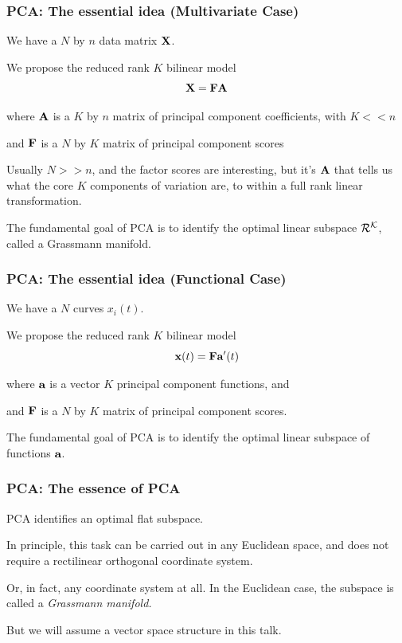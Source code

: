 \documentclass[11pt]{beamer}
\begin{document}
\begin{frame}

\frametitle{PCA: The essential idea (Multivariate Case)}

\bi
  \item We have a $N$ by $n$ data matrix $\mbox{\bf X}$.
  \item We propose the reduced rank $K$ bilinear model
  \[
    \mbox{\bf X} = \mbox{\bf F} \mbox{\bf A}
  \]
  \item where $\mbox{\bf A}$ is a $K$ by $n$ matrix of principal component coefficients, with $K << n$
  \item and $\mbox{\bf F}$ is a $N$ by $K$ matrix of principal component scores
   \item Usually $N >> n$, and the factor scores are interesting, but it's $\mbox{\bf A}$ that tells
  us what the core $K$ components of variation are, to within a full rank linear transformation.
  \item The fundamental goal of PCA is to identify the optimal linear subspace $\cal{R}^K$, called a Grassmann manifold.
\ei

\end{frame}


\begin{frame}

\frametitle{PCA: The essential idea (Functional Case)}

\bi
  \item We have a $N$ curves $x_i(t)$.
  \item We propose the reduced rank $K$ bilinear model
  \[
    \mbox{\bf x}(t) = \mbox{\bf F} \mbox{\bf a}'(t)
  \]
  \item where $\mbox{\bf a}$ is a vector $K$ principal component functions, and
  \item and $\mbox{\bf F}$ is a $N$ by $K$ matrix of principal component scores.
  \item The fundamental goal of PCA is to identify the optimal linear subspace of functions 
  $\mbox{\bf a}$.
\ei

\end{frame}


\begin{frame}

\frametitle{PCA: The essence of PCA}

\bi
  \item PCA identifies an optimal flat subspace.
  \item In principle, this task can be carried out in any Euclidean space, and does not require a rectilinear orthogonal coordinate system. 
  \item Or, in fact, any coordinate system at all.  In the Euclidean case, the subspace is called a \emph{Grassmann manifold.}
  \item But we will assume a vector space structure in this talk.
\ei

\end{frame}
\end{document}
